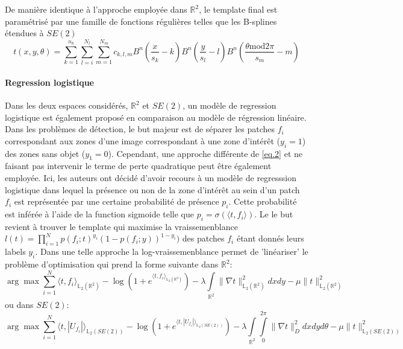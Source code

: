 \documentclass{article}
\begin{document}
De manière identique à l'approche employée dans $\mathbb{R}^2$, le template final est paramétrisé par une famille de fonctions 
régulières telles que les B-splines étendues à $SE(2)$
\[
    t(x, y, \theta) = \sum \limits_{k=1}^{n_k} \sum \limits_{l=i}^{N_l} \sum \limits_{m=1}^{N_m} c_{k,l,m} B^n \left (\frac{x}{s_k} - k \right )
    B^n \left (\frac{y}{s_l} - l \right) B^n \left (\frac{\theta \text{mod} 2\pi}{s_m} - m \right )
\]

\paragraph{Regression logistique}
Dans les deux espaces considérés, $\mathbb{R}^2$ et $SE(2)$, un modèle de regression logistique est également proposé en comparaison 
au modèle de régression linéaire. Dans les problèmes de détection, le but majeur est de séparer les patches $f_i$ correspondant aux zones d'une image correspondant à une 
zone d'intérêt ($y_i =1$) des zones sans objet ($y_1=0$). Cependant, une approche différente de \ref{eq.2} et ne faisant pas intervenir le terme de perte quadratique 
peut être également employée. Ici, les auteurs ont décidé d'avoir recours à un modèle de regresssion logistique dans lequel la présence ou non de 
la zone d'intérêt au sein d'un patch $f_i$ est représentée par une certaine probabilité de présence $p_i$. Cette probabilité est inférée à l'aide de
la function sigmoide telle que $p_i = \sigma(\langle t, f_i \rangle)$. Le le but revient à trouver le template qui maximise la vraissemenblance $l(t) = 
\prod \limits_{i=1}^N p(f_i; t)^{y_i}(1 - p(f_i; y))^{1- y_i})$ 
des patches $f_i$ étant donnés leurs labels $y_i$. Dans une telle approche la log-vraissemenblance permet de 'linéariser' le problème d'optimisation qui prend la forme
suivante dans $\mathbb{R}^2$:
\[
    \arg \max \sum \limits_{i=1}^N \langle t, f_i \rangle_{\mathbb{L}_2(\mathbb{R}^2)} - \log \left ( 1 + e^{\langle t, f_i \rangle_{\mathbb{L}_2(\mathbb{R}^2)}}\right) - \lambda \int \limits_{\mathbb{R}^2} \lVert \nabla 
    t \rVert_{\mathbb{L}_2(\mathbb{R}^2)}^2 dx dy - \mu \lVert t \rVert_{\mathbb{L}_2(\mathbb{R}^2)}^2
\]
ou dans $SE(2)$:
\[
    \arg \max \sum \limits_{i=1}^N \langle t, |U_{f_i}| \rangle_{\mathbb{L}_2(SE(2))} - \log \left ( 1 + e^{\langle t, |U_{f_i}| \rangle_{\mathbb{L}_2(SE(2))}}\right) - \lambda \int \limits_{\mathbb{R}^2} \int \limits_{0}^{2\pi}\lVert \nabla 
    t \rVert_{D}^2 dx dy d\theta- \mu \lVert t \rVert_{\mathbb{L}_2(SE(2))}^2
\]
\end{document}
